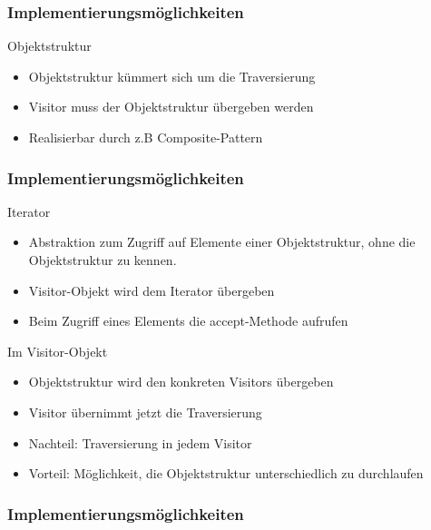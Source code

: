 \begin{frame}
	\frametitle{Implementierungsmöglichkeiten}
  \begin{block}{Objektstruktur}
  	\begin{itemize}
  		\item Objektstruktur kümmert sich um die Traversierung 
  		\item Visitor muss der Objektstruktur übergeben werden
  		\item Realisierbar durch z.B Composite-Pattern
  	\end{itemize}
  \end{block}
\end{frame}

\begin{frame}
	\frametitle{Implementierungsmöglichkeiten}
  \begin{block}{Iterator}
  	\begin{itemize}
  		\item Abstraktion zum Zugriff auf Elemente einer Objektstruktur, ohne die  Objektstruktur zu kennen.
  		\item Visitor-Objekt wird dem Iterator übergeben
  		\item Beim Zugriff eines Elements die accept-Methode aufrufen

  	\end{itemize}
  \end{block}
	\begin{block}{Im Visitor-Objekt}
  	\begin{itemize}
  		\item Objektstruktur wird den konkreten Visitors übergeben
  		\item Visitor übernimmt jetzt die Traversierung
  		\item Nachteil: Traversierung in jedem Visitor
  		\item Vorteil: Möglichkeit, die Objektstruktur unterschiedlich zu durchlaufen
  	\end{itemize}
  \end{block}
\end{frame}


\begin{frame}
	\frametitle{Implementierungsmöglichkeiten}

\end{frame}

